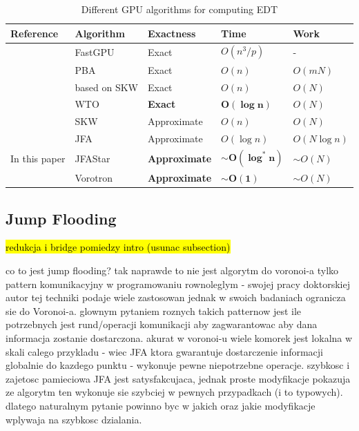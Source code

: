 \documentclass[format=acmsmall,screen,review,authordraft,nonacm]{acmart}
\newcommand{\ourjfasingle}{JFAStar}
\newcommand{\ourjfa}{Vorotron} %
\begin{document}
\begin{table}[H] \centering
\begin{tabular}{@{}lllll@{}}
\toprule
\textbf{Reference}                & \textbf{Algorithm}    & \textbf{Exactness}
	& \textbf{Time}         & \textbf{Work}         \\ \midrule
\citep{de2017fast}       & FastGPU      & Exact       & $O(n^3/p)$   & -            \\
\citep{cao2010parallel}  & PBA          & Exact       & $O(n)$       & $O(mN)$      \\
\citep{honda2017simple}  & based on SKW & Exact       & $O(n)$       & $O(N)$       \\
\citep{manduhu2019work}  & WTO          & \cellcolor{blue!25}\textbf{Exact}&
	\cellcolor{blue!25}$\mathbf{O(\log n)}$  & $O(N)$       \\
\citep{schneider2009gpu} & SKW          & Approximate & $O(n)$       & $O(N)$       \\
\citep{rong2006jump}     & JFA          & Approximate & $O(\log n)$  & $O(N\log n)$ \\ \bottomrule
In this paper            & \ourjfasingle&
	\cellcolor{blue!25}\textbf{Approximate} &
	\cellcolor{blue!25}$\sim$$\mathbf{O(\log^{\ast} n)}$ & $\sim$$O(N)$ \\
                         & \ourjfa      &
	\cellcolor{blue!25}\textbf{Approximate} &
	\cellcolor{blue!25}$\sim$$\mathbf{O(1)}$ & $\sim$$O(N)$ \\
\bottomrule
\end{tabular}
\vspace{1em}
\caption{Different GPU algorithms for computing EDT}
\end{table}

\subsection{Jump Flooding} %

\hl{redukcja i bridge pomiedzy intro (usunac subsection)}

co to jest jump flooding? tak naprawde to nie jest algorytm do voronoi-a tylko
pattern komunikacyjny w programowaniu rownoleglym - swojej pracy doktorskiej
autor tej techniki podaje wiele zastosowan jednak w swoich badaniach ogranicza
sie do Voronoi-a. glownym pytaniem roznych takich patternow jest ile potrzebnych
jest rund/operacji komunikacji aby zagwarantowac aby dana informacja zostanie
dostarczona. akurat w voronoi-u wiele komorek jest lokalna w skali calego
przykladu - wiec JFA ktora gwarantuje dostarczenie informacji globalnie do
kazdego punktu - wykonuje pewne niepotrzebne operacje.  szybkosc i zajetosc
pamieciowa JFA jest satysfakcujaca, jednak proste modyfikacje pokazuja ze
algorytm ten wykonuje sie szybciej w pewnych przypadkach (i to typowych).
dlatego naturalnym pytanie powinno byc w jakich oraz jakie modyfikacje wplywaja
na szybkosc dzialania.
\end{document}
